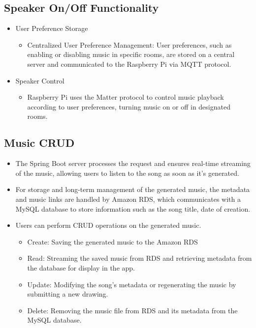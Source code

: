 \documentclass[conference]{IEEEtran}
\begin{document}
\subsection{Speaker On/Off Functionality}
\begin{itemize}
    \item User Preference Storage
\begin{itemize}
    \item Centralized User Preference Management: User preferences, such as enabling or disabling music in specific rooms, are stored on a central server and communicated to the Raspberry Pi via MQTT protocol.\\
\end{itemize}
\end{itemize}
\begin{itemize}
    \item Speaker Control
\begin{itemize}
    \item Raspberry Pi uses the Matter protocol to control music playback according to user preferences, turning music on or off in designated rooms.\\
\end{itemize}
\end{itemize}

\subsection{Music CRUD}
\begin{itemize}
    \item The Spring Boot server processes the request and ensures real-time streaming of the music, allowing users to listen to the song as soon as it's generated.\\
    \item For storage and long-term management of the generated music, the metadata and music links are handled by Amazon RDS, which communicates with a MySQL database to store information such as the song title, date of creation.\\
    \item Users can perform CRUD operations on the generated music.
\begin{itemize}
    \item Create: Saving the generated music to the Amazon RDS
    \item Read: Streaming the saved music from RDS and retrieving metadata from the database for display in the app.\\
    \item Update: Modifying the song’s metadata or regenerating the music by submitting a new drawing.\\
    \item Delete: Removing the music file from RDS and its metadata from the MySQL database.
\end{itemize}
\end{itemize}
\end{document}
